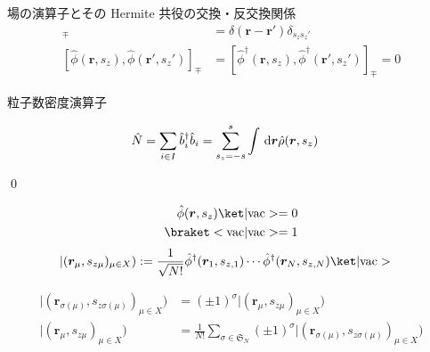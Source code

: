 \documentclass[uplatex,dvipdfmx,a4paper,11pt]{jlreq}
\makeatletter
\renewcommand{\SS}{\mathfrak{S}}
\newcommand{\rr}{\bm{r}}
\numberwithin{equation}{section}
\theoremstyle{definition}
\renewenvironment{proof}[1][\proofname]{\par
  \normalfont
  \topsep6\p@\@plus6\p@ \trivlist
  \item[\hskip\labelsep{\bfseries #1}\@addpunct{\bfseries}]\ignorespaces\quad\par
}{
  \qed\endtrivlist\@endpefalse
}
\renewcommand\proofname{証明}
\makeatother
\begin{document}
\begin{theorem}
  場の演算子とその Hermite 共役の交換・反交換関係
  \begin{align}
    [\hat{\phi}(\rr, s_z), \hat{\phi}^\dagger(\rr', s_z')]_\mp & = \delta(\rr - \rr')\delta_{s_zs_z'}                                     \\
    [\hat{\phi}(\rr, s_z), \hat{\phi}(\rr', s_z')]_\mp         & = [\hat{\phi}^\dagger(\rr, s_z), \hat{\phi}^\dagger(\rr', s_z')]_\mp = 0
  \end{align}
\end{theorem}
\begin{theorem}
  粒子数密度演算子
\end{theorem}
\begin{proof}
  \begin{align}
    \hat{N} & = \sum_{i\in I}\hat{b}_i^\dagger\hat{b}_i = \sum_{s_z = -s}^{s}\int\dl{\rr}\hat{\rho}(\rr, s_z)
  \end{align}
\end{proof}
\begin{definition}
  \begin{align}
    \hat{\phi}(\rr, s_z)\ket|\mathrm{vac}> = 0 \\
    \braket<\mathrm{vac}|\mathrm{vac}> = 1
  \end{align}
  \begin{align}
    |(\rr_\mu, s_{z\mu})_{\mu\in X}) & := \frac{1}{\sqrt{N!}}\hat{\phi}^\dagger(\rr_1, s_{z,1})\cdots\hat{\phi}^\dagger(\rr_N, s_{z,N})\ket|\mathrm{vac}>
  \end{align}
\end{definition}
\begin{theorem}
  \begin{align}
    |(\rr_{\sigma(\mu)}, s_{z\sigma(\mu)})_{\mu\in X}) & = (\pm 1)^\sigma|(\rr_{\mu}, s_{z\mu})_{\mu\in X})                                                  \\
    |(\rr_{\mu}, s_{z\mu})_{\mu\in X})                 & = \frac{1}{N!}\sum_{\sigma\in\SS_N}(\pm 1)^\sigma|(\rr_{\sigma(\mu)}, s_{z\sigma(\mu)})_{\mu\in X})
  \end{align}
\end{theorem}
\end{document}
